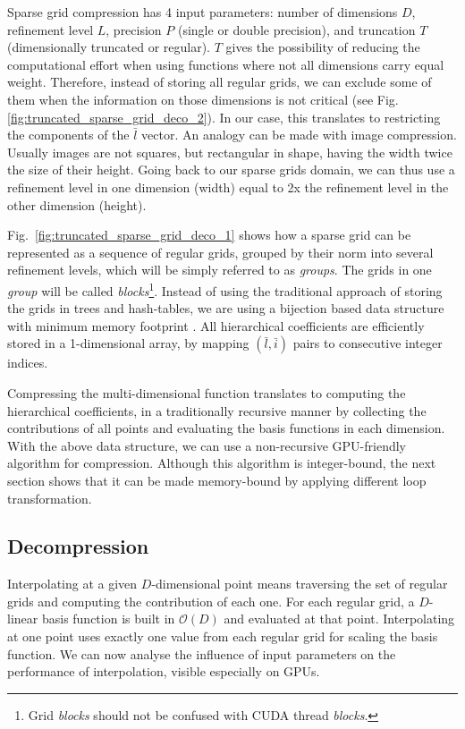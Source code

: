 Sparse grid compression has 4 input parameters: number of dimensions $D$,
refinement level $L$, precision $P$ (single or double precision), and truncation
$T$ (dimensionally truncated or regular). $T$ gives the possibility of reducing
the computational effort when using functions where not all dimensions carry
equal weight. Therefore, instead of storing all regular grids, we can exclude
some of them when the information on those dimensions is not critical (see Fig.
\ref{fig:truncated_sparse_grid_deco_2}). In our case, this translates to
restricting the components of the $\bar{l}$ vector. An analogy can be made with
image compression. Usually images are not squares, but rectangular in shape,
having the width twice the size of their height. Going back to our sparse grids
domain, we can thus use a refinement level in one dimension (width) equal to 2x
the refinement level in the other dimension (height).

Fig.~\ref{fig:truncated_sparse_grid_deco_1} shows how a sparse grid can be
represented as a sequence of regular grids, grouped by their norm into several
refinement levels, which will be simply referred to as \textit{groups}. The
grids in one \textit{group} will be called \textit{blocks}\footnote{Grid
\textit{blocks} should not be confused with CUDA thread \textit{blocks}.}.
Instead of using the traditional approach of storing the grids in trees and
hash-tables, we are using a bijection based data structure with minimum memory
footprint \cite{Murarasu:2011:CDS:1941553.1941559}. All hierarchical
coefficients are efficiently stored in a 1-dimensional array, by mapping
$(\bar{l},\bar{i})$ pairs to consecutive integer indices.

Compressing the multi-dimensional function translates to computing the
hierarchical coefficients, in a traditionally recursive manner by collecting the
contributions of all points and evaluating the basis functions in each
dimension. With the above data structure, we can use a non-recursive
GPU-friendly algorithm for compression. Although this algorithm is
integer-bound, the next section shows that it can be made memory-bound by
applying different loop transformation.

\subsection{Decompression}

Interpolating at a given $D$-dimensional point means traversing the set of
regular grids and computing the contribution of each one. For each regular grid,
a $D$-linear basis function is built in $\mathcal{O}(D)$ and evaluated at that
point. Interpolating at one point uses exactly one value from each regular grid
for scaling the basis function. We can now analyse the influence of input
parameters on the performance of interpolation, visible especially on GPUs.


